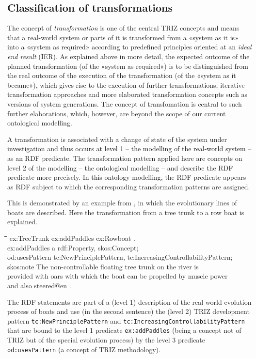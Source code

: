 \documentclass[11pt,a4paper]{article}
\newenvironment{code}{\tt \begin{tabbing}
\hskip12pt\=\hskip12pt\=\hskip12pt\=\hskip12pt\=\hskip5cm\=\hskip5cm\=\kill}
{\end{tabbing}}
\def\dq{{\char34}}
\begin{document}
\subsection{Classification of transformations}

The concept of \emph{transformation} is one of the central TRIZ concepts and
means that a real-world system or parts of it is transformed from a «system as
it is» into a «system as required» according to predefined principles oriented
at an \emph{ideal end result} (IER). As explained above in more detail, the
expected outcome of the planned transformation (of the «system as required»)
is to be distinguished from the real outcome of the execution of the
transformation (of the «system as it became»), which gives rise to the
execution of further transformations, iterative transformation approaches and
more elaborated transformation concepts such as versions of system
generations.  The concept of transfomation is central to such further
elaborations, which, however, are beyond the scope of our current ontological
modelling.

A transformation is associated with a change of state of the system under
investigation and thus occurs at level 1 -- the modelling of the real-world
system -- as an RDF predicate. The transformation pattern applied here are
concepts on level 2 of the modelling -- the ontological modelling -- and
describe the RDF predicate more precisely. In this ontology modelling, the RDF
predicate appears as RDF subject to which the corresponding transformation
patterns are assigned.

This is demonstrated by an example from \cite[Fig. 4.20]{Koltze2017}, in which
the evolutionary lines of boats are described.  Here the transformation from a
tree trunk to a row boat is explained. 
\begin{code}
  ex:TreeTrunk ex:addPaddles ex:Rowboat .\\[4pt]

  ex:addPaddles a rdf:Property, skos:Concept;\\
  \>od:usesPattern tc:NewPrinciplePattern,
  tc:IncreasingControllabilityPattern;  \\
  \> skos:note {\dq}{\dq}{\dq}The non-controllable floating tree trunk on the
  river is \\\>\>provided with oars with which the boat can be propelled by
  muscle power \\\>\> and also steered{\dq}{\dq}{\dq}@en .
\end{code}
The RDF statements are part of a (level 1) description of the real world
evolution process of boats and use (in the second sentence) the (level 2) TRIZ
development pattern \texttt{tc:NewPrinciplePattern} and
\texttt{tc:IncreasingControllabilityPattern} that are bound to the level 1
predicate \texttt{ex:addPaddles} (being a concept not of TRIZ but of the
special evolution process) by the level 3 predicate \texttt{od:usesPattern} (a
concept of TRIZ methodology).
\end{document}

